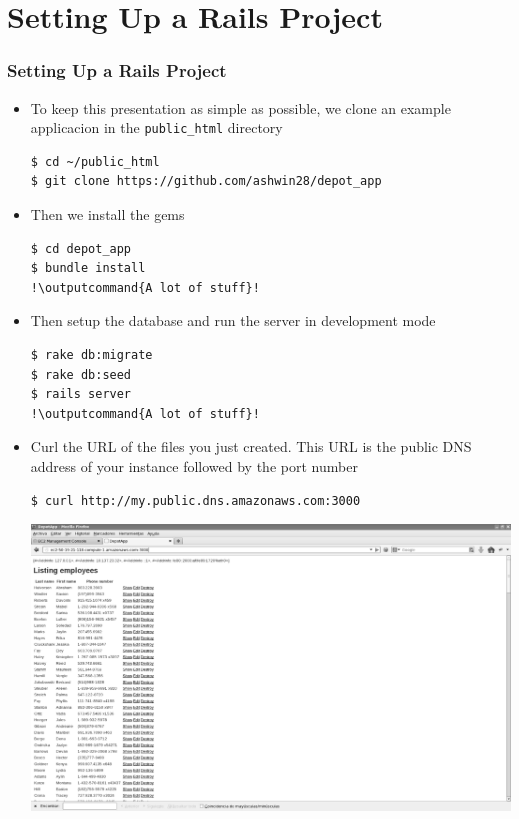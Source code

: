 \documentclass{beamer}
\newcommand{\outputcommand}[1]{\color{darkgreen}{#1}}
\begin{document}
\section{Setting Up a Rails Project}
\begin{frame}
\frametitle{Setting Up a Rails Project}
\begin{itemize}
\item To keep this presentation as simple as possible, we clone an example applicacion in the \texttt{public\_html} directory 

\lstset{language=shell, escapechar=!}
\begin{lstlisting}[escapechar=!]
$ cd ~/public_html
$ git clone https://github.com/ashwin28/depot_app
\end{lstlisting}

\item Then we install the gems 

\lstset{language=shell, escapechar=!}
\begin{lstlisting}[escapechar=!]
$ cd depot_app
$ bundle install
!\outputcommand{A lot of stuff}!
\end{lstlisting}

\item Then setup the database and run the server in development mode

\lstset{language=shell, escapechar=!}
\begin{lstlisting}[escapechar=!]
$ rake db:migrate
$ rake db:seed
$ rails server
!\outputcommand{A lot of stuff}!
\end{lstlisting}

\item Curl the URL of the files you just created.
This URL is the public DNS address of your instance followed by the port number

\begin{lstlisting}[escapechar=!]
$ curl http://my.public.dns.amazonaws.com:3000
\end{lstlisting}

\includegraphics[width=0.75 \textwidth]{tienda.eps}
\end{itemize}
\end{frame}
\end{document}

